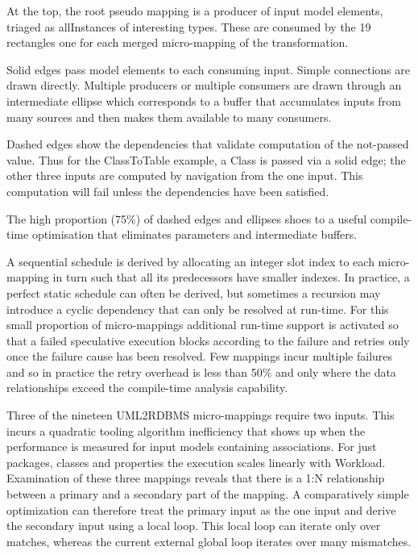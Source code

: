 \documentclass{llncs}
\begin{document}
At the top, the root pseudo mapping is a producer of input model elements, triaged as allInstances of interesting types. These are consumed by the 19 rectangles one for each merged micro-mapping of the transformation.

Solid edges pass model elements to each consuming input. Simple connections are drawn directly. Multiple producers or multiple consumers are drawn through an intermediate ellipse which corresponds to a buffer that accumulates inputs from many sources and then makes them available to many consumers.

Dashed edges show the dependencies that validate computation of the not-passed value. Thus for the ClassToTable example, a Class is passed via a solid edge; the other three inputs are computed by navigation from the one input. This computation will fail unless the dependencies have been satisfied.

The high proportion (75\%) of dashed edges and ellipses shoes to a useful compile-time optimisation that eliminates parameters and intermediate buffers.

A sequential schedule is derived by allocating an integer slot index to each micro-mapping in turn such that all its predecessors have smaller indexes. In practice, a perfect static schedule can often be derived, but sometimes a recursion may introduce a cyclic dependency that can only be resolved at run-time. For this small proportion of micro-mappings additional run-time support is activated so that a failed speculative execution blocks according to the failure and retries only once the failure cause has been resolved. Few mappings incur multiple failures and so in practice the retry overhead is less than 50\% and only where the data relationships exceed the compile-time analysis capability.

Three of the nineteen UML2RDBMS micro-mappings require two inputs. This incurs a quadratic tooling algorithm inefficiency that shows up when the performance is measured for input models containing associations. For just packages, classes and properties the execution scales linearly with Workload. Examination of these three mappings reveals that there is a 1:N relationship between a primary and a secondary part of the mapping. A comparatively simple optimization can therefore treat the primary input as the one input and derive the secondary input using a local loop. This local loop can iterate only over matches, whereas the current external global loop iterates over many mismatches.
\end{document}
